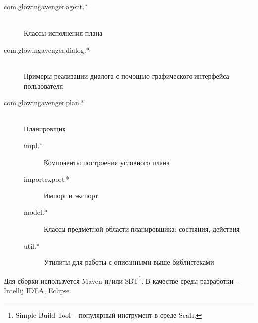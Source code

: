 \begin{description}
 \item[com.glowingavenger.agent.*]\hfill \\
 Классы исполнения плана
 \item[com.glowingavenger.dialog.*] \hfill \\
 Примеры реализации диалога с помощью графического интерфейса пользователя
 \item[com.glowingavenger.plan.*] \hfill \\
 Планировщик
 \begin{description}
  \item[impl.*]
  Компоненты построения условного плана
  \item[importexport.*]
  Импорт и экспорт
  \item[model.*]
  Классы предметной области планировщика: состояния, действия
  \item[util.*]
  Утилиты для работы с описанными выше библиотеками
 \end{description}
\end{description}

Для сборки используется Maven и/или SBT\footnote{Simple Build Tool -- популярный инструмент в среде Scala.}. В качестве среды разработки -- Intellij IDEA, Eclipse.


